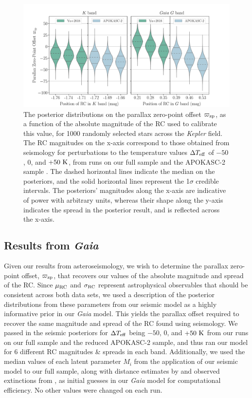 \documentclass[fleqn,usenatbib]{mnras}
\newcommand{\oozp}{\mbox{$\varpi_{\rm zp}$}\xspace}
\newcommand{\kepler}{\emph{Kepler}\xspace}
\newcommand{\gaia}{\emph{Gaia}\xspace}
\newcommand{\nnew}[1]{#1}
\begin{document}
\begin{figure}
    \centering
    \includegraphics[width=\textwidth]{gaia_posteriors_upgraded.pdf}
    \caption{The posterior distributions on the parallax zero-point offset \oozp, as a function of the absolute magnitude of the RC used to calibrate this value, for 1000 randomly selected stars across the \kepler field. The RC magnitudes on the x-axis correspond to those obtained from seismology for perturbations to the temperature values $\Delta T_{\rm eff}$ of $-50$, $0$, and $+50\ \rm K$, from runs on our full sample \protect\citep{art:yu+2018} and the APOKASC-2 sample \protect\citep{art:pinsonneault+2018}. The dashed horizontal lines indicate the median on the posteriors, and the solid horizontal lines represent \nnew{the 1$\sigma$ credible intervals}. The posteriors' magnitudes along the x-axis are indicative of power with arbitrary units, whereas their shape along the y-axis indicates the spread in the posterior result, and is reflected across the x-axis.}
    \label{fig:gaia_posteriors}    
\end{figure}


\subsection{Results from \gaia}
Given our results from asteroseismology, we wish to determine the parallax zero-point offset, \oozp, that recovers our values of the absolute magnitude and spread of the RC. Since $\mu_{\rm RC}$ and $\sigma_{\rm RC}$ represent astrophysical observables that should be consistent across both data sets, we used a description of the posterior distributions from these parameters from our seismic model as a highly informative prior in our \gaia model. This yields the parallax offset required to recover the same magnitude and spread of the RC found using seismology. We passed in the seismic posteriors for $\Delta T_{\rm eff}$ being $-50$, $0$, and $+50\ \rm K$ from our runs on our full sample and the reduced APOKASC-2 sample, and thus ran our model for 6 different RC magnitudes \& spreads in each band. Additionally, we used the median values of each latent parameter $M_i$ from the application of our seismic model to our full sample, along with distance estimates by \cite{art:bailer-jones+2018} and observed extinctions from \cite{art:green+2018}, as initial guesses in our \gaia model for computational efficiency. No other values were changed on each run.
\end{document}
